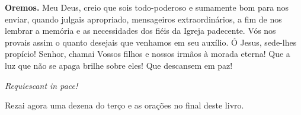 \vspace{\baselineskip}\noindent \textbf{Oremos.} Meu Deus, creio que sois todo-poderoso e sumamente bom para nos enviar, quando julgais apropriado, mensageiros extraordinários, a fim de nos lembrar a memória e as necessidades dos fiéis da Igreja padecente. Vós nos provais assim o quanto desejais que venhamos em seu auxílio. Ó Jesus, sede-lhes propício! Senhor, chamai Vossos filhos e nossos irmãos à morada eterna! Que a luz que não se apaga brilhe sobre eles! Que descansem em paz!



\begin{center}
\textit{Requiescant in pace!}
\end{center}

Rezai agora uma dezena do terço e as orações no final deste livro.
